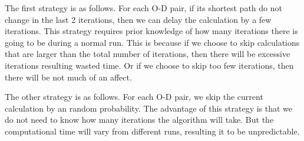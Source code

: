 The first strategy is as follows.
For each O-D pair, if its shortest path do not change in the last 2 iterations,
then we can delay the calculation by a few iterations.
This strategy requires prior knowledge of how many iterations there is going to be during a normal run.
This is because if we choose to skip calculations that are larger than the total number of iterations, then there will be excessive iterations resulting wasted time.
Or if we choose to skip too few iterations,
then there will be not much of an affect.

The other strategy is as follows.
For each O-D pair, we skip the current calculation by an random probability.
The advantage of this strategy is that we do not need to know how many iterations the algorithm will take.
But the computational time will vary from different runs,
resulting it to be unpredictable.


\begin{comment}
\section{Preprocessing and More}
Preprocessing - trade memory to get faster time.
We can either do a fast preprocessing between iterations to make query in each iteration (so combined speed is still faster) 
or do a long preprocessing at the start and use the computed heuristic values
\begin{itemize}
    \item A* landmarks and triangle inequality (ALT)
    \item Reach-based routing 
    \item ALT + Reach
    \item Geometric Containers
    \item Arc Flags
\end{itemize}

If we have more data on the network we can use
algorithms that use hierarchies.
Consider roads with higher speed first: use a hierarchy of subgraphs.
\begin{itemize}
    \item Radius search.
    \item multi-level approach
    \item highway hierarchies
\end{itemize}
\end{comment}

